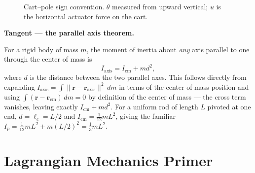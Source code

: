 \documentclass[11pt]{article}
\newenvironment{tangent}[1]{%
  \par\smallskip\noindent\hrulefill\par
  \noindent\textbf{Tangent — #1.}\par\smallskip
  \begingroup\itshape
}{%
  \endgroup
  \par\noindent\hrulefill\par\smallskip
}
\newcommand{\mb}[1]{\mathbf{#1}}
\begin{document}
\begin{figure}[h]
\centering
{}
\caption{Cart--pole sign convention. $\theta$ measured from upward
vertical; $u$ is the horizontal actuator force on the cart.}
\label{fig:cartpole}
\end{figure}

\begin{tangent}{the parallel axis theorem}
\label{sec:parallelaxis}
For a rigid body of mass $m$, the moment of inertia about \emph{any} axis
parallel to one through the center of mass is
\[
  I_{\text{axis}} = I_{\mathrm{cm}} + m d^2,
\]
where $d$ is the distance between the two parallel axes. This follows
directly from expanding $I_{\text{axis}} = \int \|\mb r - \mb r_{\text{axis}}\|^2\, dm$
in terms of the center-of-mass position and using $\int (\mb r - \mb
r_{\mathrm{cm}})\,dm = 0$ by definition of the center of mass — the cross
term vanishes, leaving exactly $I_{\mathrm{cm}} + md^2$. For a uniform rod
of length $L$ pivoted at one end, $d = \ell_c = L/2$ and $I_{\mathrm{cm}} =
\tfrac{1}{12}mL^2$, giving the familiar $I_p = \tfrac{1}{12}mL^2 +
m(L/2)^2 = \tfrac{1}{3}mL^2$.
\end{tangent}

\section{Lagrangian Mechanics Primer}
\end{document}
